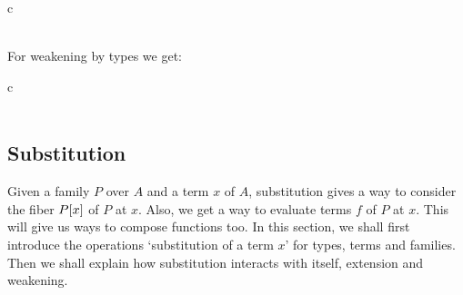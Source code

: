 \begin{infarray}{c}
          {
            {}}\\
          {
            {}
            {}}\\
          {
            {}{}{}}
\end{infarray}

For weakening by types we get:

\begin{infarray}{c}
          {
            {}}\\
          {
            {}
            {}}\\
          {
            {}{}{}}
\end{infarray}

\subsection{Substitution}
Given a family $P$ over $A$ and a term $x$ of $A$, substitution gives a way to
consider the fiber $\subst{x}{P}$ of $P$ at $x$. Also, we get a way to evaluate
terms $f$ of $P$ at $x$. This will give us ways to compose functions too. In
this section, we shall first introduce the operations `substitution of a term $x$'
for types, terms and families. Then we shall explain how substitution interacts
with itself, extension and weakening.

